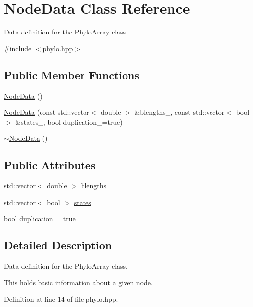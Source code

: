 \hypertarget{class_node_data}{}\section{Node\+Data Class Reference}
\label{class_node_data}


Data definition for the {\ttfamily Phylo\+Array} class.  




{\ttfamily \#include $<$phylo.\+hpp$>$}

\subsection*{Public Member Functions}
\begin{DoxyCompactItemize}
\item 
\hyperlink{class_node_data_a56da12a9de7c80c25a905012749c8671}{Node\+Data} ()
\item 
\hyperlink{class_node_data_a0a90191ba4c987afa3406f829967d8e2}{Node\+Data} (const std\+::vector$<$ double $>$ \&blengths\+\_\+, const std\+::vector$<$ bool $>$ \&states\+\_\+, bool duplication\+\_\+=true)
\item 
\hyperlink{class_node_data_ad870d466c40b9be96ad79adccab79038}{$\sim$\+Node\+Data} ()
\end{DoxyCompactItemize}
\subsection*{Public Attributes}
\begin{DoxyCompactItemize}
\item 
std\+::vector$<$ double $>$ \hyperlink{class_node_data_a02da5f097c105813216d87ef89ad7bd4}{blengths}
\item 
std\+::vector$<$ bool $>$ \hyperlink{class_node_data_a33caaadde6afe892624501bdb0edaea6}{states}
\item 
bool \hyperlink{class_node_data_a6c21d52091bb4fa6e3d431856da17caa}{duplication} = true
\end{DoxyCompactItemize}


\subsection{Detailed Description}
Data definition for the {\ttfamily Phylo\+Array} class. 

This holds basic information about a given node. 

Definition at line 14 of file phylo.\+hpp.



